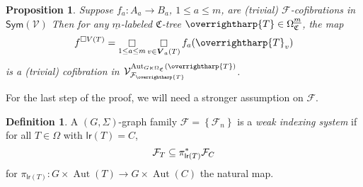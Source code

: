 \documentclass[a4paper,10pt
,draft
]{article}%
\numberwithin{equation}{section}
\numberwithin{figure}{section}
\newtheorem{proposition}[equation]{Proposition}%
\theoremstyle{definition} %
\newtheorem{definition}[equation]{Definition}%
\newcommand{\set}[1]{\left\{#1\right\}}%
\newcommand{\vect}[1]{\text{\overrightharp{\ensuremath{#1}}}}
\newcommand{\Sym}{\ensuremath{\mathsf{Sym}}}%
\DeclareMathOperator{\Aut}{Aut}%
\newcommand{\F}{\ensuremath{\mathcal F}}
\newcommand{\V}{\ensuremath{\mathcal V}}
\newcommand{\1}{\ensuremath{\mathbbm 1}}%
\begin{document}
\begin{proposition} %
      \label{BOXVT_PROP}
      Suppose $f_a: A_a \to B_a$, $1 \leq a \leq m$, are (trivial) $\F$-cofibrations in $\Sym(\V)$
      Then for any $\underline{m}$-labeled $\mathfrak C$-tree $\vect T \in \Omega^{\underline{m}}_{\mathfrak C}$, the map
      \[
            f^{\square V(T)} = \mathop{\square}\limits_{1 \leq a \leq m} \mathop{\square}\limits_{v \in \boldsymbol{V}_a(T)} f_a(\vect T_v)
      \]
      is a (trivial) cofibration in $\V^{\Aut_{G \ltimes \Omega_{\mathfrak C}}(\vect T)}_{\F_{\vect T}}$.
\end{proposition}

For the last step of the proof, we will need a stronger assumption on $\F$.
\begin{definition}
      \label{WIS_DEF}
      A $(G,\Sigma)$-graph family $\F = \set{\F_n}$ is a \textit{weak indexing system} if
      for all $T \in \Omega$ with $\mathsf{lr}(T) = C$,
      \begin{equation}
            \label{WIS_EQ}
            \F_T \subseteq \pi_{\mathsf{lr}(T)}^{\**} \F_C
      \end{equation}
      for $\pi_{\mathsf{lr}(T)} \colon G \times \Aut(T) \to G \times \Aut(C)$ the natural map.
\end{definition}
\end{document}
